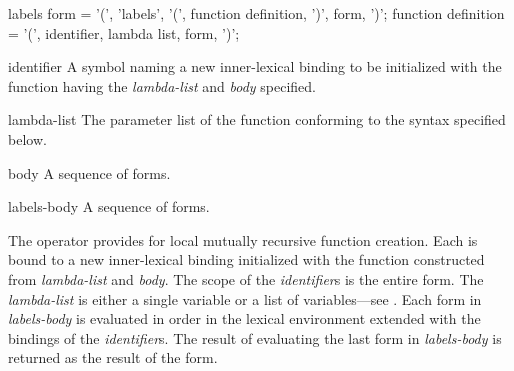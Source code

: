 \begin{optDefinition}
%
\Syntax
\savesyntax{}\vbox{\syntax
labels form
   = '(', 'labels',
          '(', {function definition}, ')',
          {form}, ')';
function definition
   = '(', identifier, lambda list, {form}, ')';
\endsyntax}
%
\begin{arguments}
    \item[identifier] A symbol naming a new inner-lexical binding to be
    initialized with the function having the {\em lambda-list} and {\em body}
    specified.

    \item[lambda-list] The parameter list of the function conforming to the
    syntax specified below.

    \item[body] A sequence of forms.

    \item[labels-body] A sequence of forms.
\end{arguments}
%
\result%
The  operator provides for local mutually recursive function
creation.  Each \identifier{} is bound to a new inner-lexical binding
initialized with the function constructed from {\em lambda-list} and {\em body}.
The scope of the {\em identifier}s is the entire 
form.  The
{\em lambda-list} is either a single variable or a list of variables---see
.  Each form in {\em labels-body} is evaluated in order in
the lexical environment extended with the bindings of the {\em identifier}s.
The result of evaluating the last form in {\em labels-body}\/ is returned as the
result of the  form.


\end{optDefinition}
